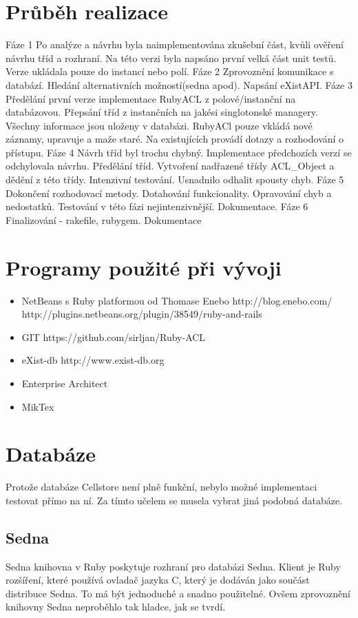 \documentclass[11pt,twoside,a4paper]{book}
\begin{document}
\section{Průběh realizace}
Fáze 1 
Po analýze a návrhu byla naimplementována zkušební část, kvůli ověření návrhu tříd a rozhraní. Na této verzi byla napsáno první velká část unit testů. Verze ukládala pouze do instancí nebo polí.
Fáze 2
Zprovoznění komunikace s databází. Hledání alternativních možností(sedna apod). Napsání eXistAPI.
Fáze 3
Předělání první verze implementace RubyACL z polové/instanční na databázovou. Přepsání tříd z instančních na jakési singlotonské managery. Všechny informace jsou uloženy v databázi. RubyACl pouze vkládá nové záznamy, upravuje a maže staré. Na existujících provádí dotazy a rozhodování o přístupu.
Fáze 4
Návrh tříd byl trochu chybný. Implementace předchozích verzí se odchylovala návrhu. Předělání tříd. Vytvoření nadřazené třídy ACL_Object a dědění z této třídy. Intenzivní testování. Usnadnilo odhalit spousty chyb.
Fáze 5
Dokončení rozhodovací metody. Dotahování funkcionality. Opravování chyb a nedostatků. Testování v této fázi nejintenzivnější. Dokumentace.
Fáze 6
Finalizování - rakefile, rubygem. Dokumentace


\section{Programy použité při vývoji}
\begin{itemize}
\item NetBeans s Ruby platformou od Thomase Enebo
http://blog.enebo.com/
http://plugins.netbeans.org/plugin/38549/ruby-and-rails
\item GIT
https://github.com/sirljan/Ruby-ACL
\item eXist-db
http://www.exist-db.org
\item Enterprise Architect
\item MikTex
\end{itemize}
\section{Databáze}
Protože databáze Cellstore není plně funkční, nebylo možné implementaci testovat přímo na ní. Za tímto učelem se musela vybrat jiná podobná databáze.

\subsection{Sedna}
Sedna knihovna v Ruby poskytuje rozhraní pro databázi Sedna. Klient je Ruby rozšíření, které používá ovladač jazyka C, který je dodáván jako součást distribuce Sedna. To má být jednoduché a snadno použitelné. Ovšem zprovoznění knihovny Sedna neproběhlo tak hladce, jak se tvrdí.
\end{document}
